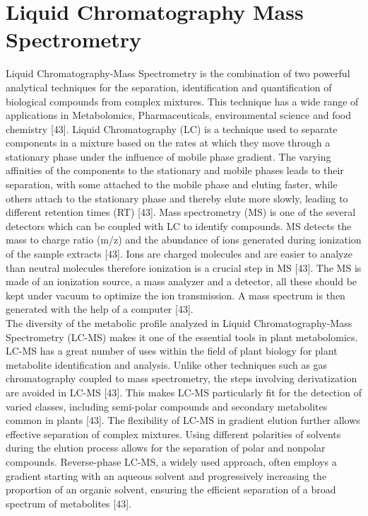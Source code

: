 \documentclass[12pt,a4paper]{report}
\begin{document}
\section{Liquid Chromatography Mass Spectrometry}
Liquid Chromatography-Mass Spectrometry is the combination of two powerful analytical techniques for the separation, identification and quantification of biological compounds from complex mixtures. This technique has a wide range of applications in Metabolomics, Pharmaceuticals, environmental science and food chemistry [43]. Liquid Chromatography (LC) 
is a technique used to separate components in a mixture based on the rates at which they move through a stationary phase under the influence of mobile phase gradient. The varying affinities of the components to the stationary and mobile phases leads to their separation, with some attached to the mobile phase and eluting faster, while others attach to 
the stationary phase and thereby elute more slowly, leading to different retention times (RT) [43]. Mass spectrometry (MS) is one of the several detectors which can be coupled with LC to identify compounds. MS detects the mass to charge ratio (m/z) and the abundance of ions generated during ionization of the sample extracts [43]. Ions are charged molecules 
and are easier to analyze than neutral molecules therefore ionization is a crucial step in MS [43]. The MS is made of an ionization source, a mass analyzer and a detector, all these should be kept under vacuum to optimize the ion transmission. A mass spectrum is then generated with the help of a computer [43]. \\

The diversity of the metabolic profile analyzed in Liquid Chromatography-Mass Spectrometry (LC-MS) makes it one of the essential tools in plant metabolomics. LC-MS has a great number of uses within the field of plant biology for plant metabolite identification and analysis. Unlike other techniques such as gas chromatography coupled to mass spectrometry, 
the steps involving derivatization are avoided in LC-MS [43]. This makes LC-MS particularly fit for the detection of varied classes, including semi-polar compounds and secondary metabolites common in plants [43]. The flexibility of LC-MS in gradient elution further allows effective separation of complex mixtures. Using different polarities of solvents 
during the elution process allows for the separation of polar and nonpolar compounds. Reverse-phase LC-MS, a widely used approach, often employs a gradient starting with an aqueous solvent and progressively increasing the proportion of an organic solvent, ensuring the efficient separation of a broad spectrum of metabolites [43]. \\
\end{document}
